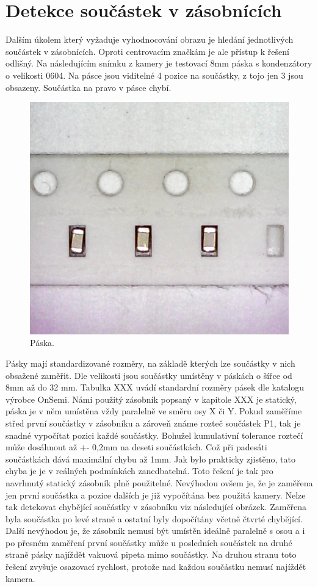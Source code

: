 \section{Detekce součástek v zásobnících}

Dalším úkolem který vyžaduje vyhodnocování obrazu je hledání jednotlivých součástek v zásobnících. Oproti centrovacím značkám je ale přístup k řešení odlišný. Na následujícím snímku z kamery je testovací 8mm páska s kondenzátory o velikosti 0604. Na pásce jsou viditelné 4 pozice na součástky, z tojo jen 3 jsou obsazeny. Součástka na pravo v pásce chybí.

\begin{figure}[h!]
  \centering
    \includegraphics[width=0.5\linewidth]{obrazky/tape3.png}%
    \caption{Páska.}
    \label{fig:tape}
\end{figure}


Pásky mají standardizované rozměry, na základě kterých lze součástky v nich obsažené zaměřit. Dle velikosti jsou součástky umístěny v páskách o šířce od 8mm až do 32 mm. Tabulka XXX uvádí standardní rozměry pásek dle katalogu výrobce OnSemi. 
Námi použitý zásobník popsaný v kapitole XXX je statický, páska je v něm umístěna vždy paralelně ve směru osy X či Y. Pokud zaměříme střed první součástky v zásobníku a zároveň známe rozteč součástek P1, tak je snadné vypočítat pozici každé součástky. Bohužel kumulativní tolerance roztečí může dosáhnout až +- 0,2mm na deseti součástkách. Což při padesáti součástkách dává maximální chybu až 1mm. Jak bylo prakticky zjistěno, tato chyba je je v reálných podmínkách zanedbatelná. Toto řešení je tak pro navrhnutý statický zásobník plně použitelné. Nevýhodou ovšem je, že je zaměřena jen první součástka a pozice dalších je již vypočítána bez použitá kamery.  Nelze tak detekovat chybějící součástky v zásobníku viz následující obrázek. Zaměřena byla součástka po levé straně a ostatní byly dopočítány včetně čtvrté chybějící. Další nevýhodou je, že zásobník nemusí být umístěn ideálně paralelně s osou a i po přesném zaměření první součástky může u posledních součástek na druhé straně pásky najíždět vakuová pipeta mimo součástky. Na druhou stranu toto řešení zvyšuje osazovací rychlost, protože nad každou součástku nemusí najíždět kamera.

